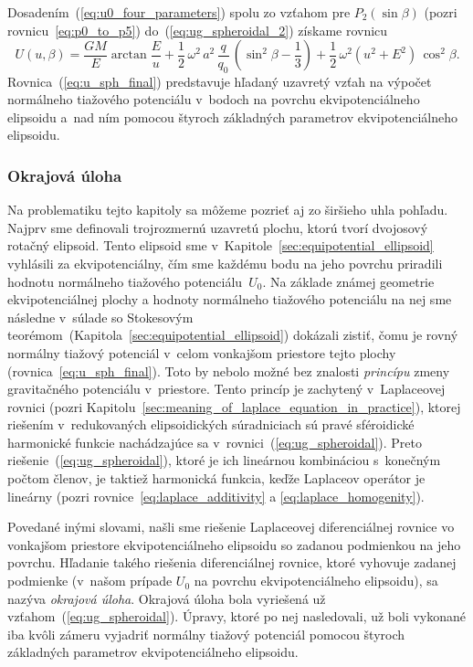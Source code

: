\documentclass[a4paper, 12pt]{book}
\begin{document}
Dosadením~(\ref{eq:u0_four_parameters}) spolu zo vzťahom pre $P_2(\sin\beta)$ 
(pozri rovnicu~\ref{eq:p0_to_p5}) do~(\ref{eq:ug_spheroidal_2}) získame rovnicu
%
\begin{equation}
\label{eq:u_sph_final}
U(u, \beta) = \frac{GM}{E} \arctan\frac{E}{u} + \frac{1}{2} \, \omega^2 \, a^2 
\, \frac{q}{q_0} \, \left( \sin^2\beta - \frac{1}{3} \right) + \frac{1}{2} \, 
\omega^2 (u^2 + E^2) \, \cos^2\beta{.}
\end{equation}
%
Rovnica~(\ref{eq:u_sph_final}) predstavuje hľadaný uzavretý vzťah na výpočet 
normálneho tiažového potenciálu v~bodoch na povrchu ekvipotenciálneho elipsoidu 
a~nad ním pomocou štyroch základných parametrov ekvipotenciálneho elipsoidu.



\subsubsection{Okrajová úloha}
\label{sec:u_boundary_value_problem}

Na problematiku tejto kapitoly sa môžeme pozrieť aj zo širšieho uhla pohľadu.  
Najprv sme definovali trojrozmernú uzavretú plochu, ktorú tvorí dvojosový 
rotačný elipsoid.  Tento elipsoid sme 
v~Kapitole~\ref{sec:equipotential_ellipsoid} vyhlásili za ekvipotenciálny, čím 
sme každému bodu na jeho povrchu priradili hodnotu normálneho tiažového 
potenciálu~$U_0$.  Na základe známej geometrie ekvipotenciálnej plochy 
a hodnoty normálneho tiažového potenciálu na nej sme následne v~súlade so 
Stokesovým teorémom~(Kapitola~\ref{sec:equipotential_ellipsoid}) dokázali 
zistiť, čomu je rovný normálny tiažový potenciál v~celom vonkajšom priestore 
tejto plochy (rovnica~\ref{eq:u_sph_final}).  Toto by nebolo možné bez znalosti 
\emph{princípu} zmeny gravitačného potenciálu v~priestore.  Tento princíp je 
zachytený v~Laplaceovej rovnici (pozri 
Kapitolu~\ref{sec:meaning_of_laplace_equation_in_practice}), ktorej riešením 
v~redukovaných elipsoidických súradniciach sú pravé sféroidické harmonické 
funkcie nachádzajúce sa v~rovnici~(\ref{eq:ug_spheroidal}).  Preto 
riešenie~(\ref{eq:ug_spheroidal}), ktoré je ich lineárnou kombináciou 
s~konečným počtom členov, je taktiež harmonická funkcia, keďže Laplaceov 
operátor je lineárny (pozri rovnice~\ref{eq:laplace_additivity} 
a \ref{eq:laplace_homogenity}).

Povedané inými slovami, našli sme riešenie Laplaceovej diferenciálnej rovnice 
vo vonkajšom priestore ekvipotenciálneho elipsoidu so zadanou podmienkou na 
jeho povrchu.  Hľadanie takého riešenia diferenciálnej rovnice, ktoré vyhovuje 
zadanej podmienke (v~našom prípade $U_0$ na povrchu ekvipotenciálneho 
elipsoidu), sa nazýva \emph{okrajová úloha}.  Okrajová úloha bola vyriešená už 
vzťahom~(\ref{eq:ug_spheroidal}).  Úpravy, ktoré po nej nasledovali, už boli 
vykonané iba kvôli zámeru vyjadriť normálny tiažový potenciál pomocou štyroch 
základných parametrov ekvipotenciálneho elipsoidu.
\end{document}
